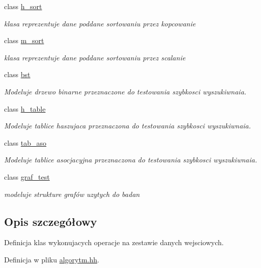 \begin{DoxyCompactItemize}
class \hyperlink{classh__sort}{h\-\_\-sort}
\begin{DoxyCompactList}\small\item\em klasa reprezentuje dane poddane sortowaniu przez kopcowanie \end{DoxyCompactList}\item 
class \hyperlink{classm__sort}{m\-\_\-sort}
\begin{DoxyCompactList}\small\item\em klasa reprezentuje dane poddane sortowaniu przez scalanie \end{DoxyCompactList}\item 
class \hyperlink{classbst}{bst}
\begin{DoxyCompactList}\small\item\em Modeluje drzewo binarne przeznaczone do testowania szybkosci wyszukiwnaia. \end{DoxyCompactList}\item 
class \hyperlink{classh__table}{h\-\_\-table}
\begin{DoxyCompactList}\small\item\em Modeluje tablice haszujaca przeznaczona do testowania szybkosci wyszukiwnaia. \end{DoxyCompactList}\item 
class \hyperlink{classtab__aso}{tab\-\_\-aso}
\begin{DoxyCompactList}\small\item\em Modeluje tablice asocjacyjna przeznaczona do testowania szybkosci wyszukiwnaia. \end{DoxyCompactList}\item 
class \hyperlink{classgraf__test}{graf\-\_\-test}
\begin{DoxyCompactList}\small\item\em modeluje strukture grafów uzytych do badan \end{DoxyCompactList}\end{DoxyCompactItemize}


\subsection{Opis szczegółowy}
Definicja klas wykonujacych operacje na zestawie danych wejsciowych. 

Definicja w pliku \hyperlink{algorytm_8hh_source}{algorytm.\-hh}.

